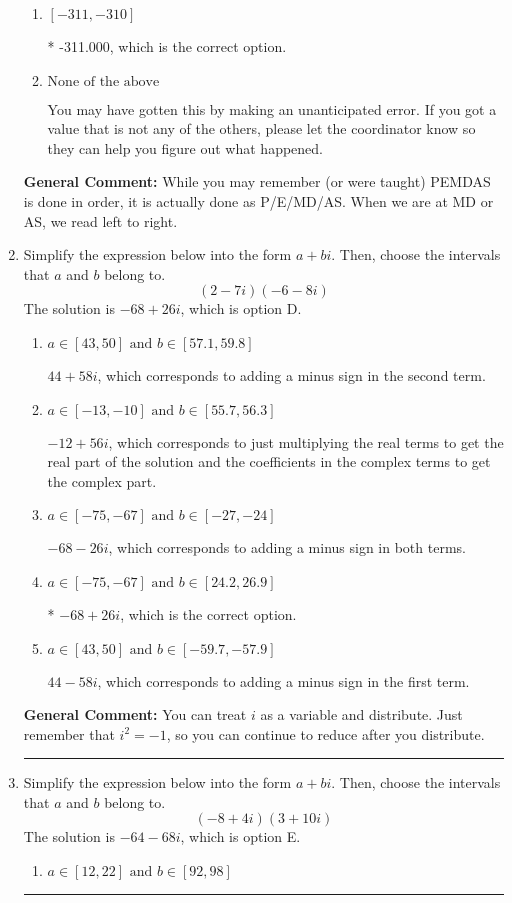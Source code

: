 \documentclass{extbook}[14pt]
\newcommand{\litem}[1]{\item #1

\rule{\textwidth}{0.4pt}}
\begin{document}
\begin{enumerate}
{\begin{enumerate}[label=\Alph*.]
 -2844.000, which corresponds to not distributing a negative correctly.
\item \( [-311, -310] \)

* -311.000, which is the correct option.
\item \( \text{None of the above} \)

 You may have gotten this by making an unanticipated error. If you got a value that is not any of the others, please let the coordinator know so they can help you figure out what happened.
\end{enumerate}

\textbf{General Comment:} While you may remember (or were taught) PEMDAS is done in order, it is actually done as P/E/MD/AS. When we are at MD or AS, we read left to right.
}
\litem{
Simplify the expression below into the form $a+bi$. Then, choose the intervals that $a$ and $b$ belong to.
\[ (2 - 7 i)(-6 - 8 i) \]The solution is \( -68 + 26 i \), which is option D.\begin{enumerate}[label=\Alph*.]
\item \( a \in [43, 50] \text{ and } b \in [57.1, 59.8] \)

 $44 + 58 i$, which corresponds to adding a minus sign in the second term.
\item \( a \in [-13, -10] \text{ and } b \in [55.7, 56.3] \)

 $-12 + 56 i$, which corresponds to just multiplying the real terms to get the real part of the solution and the coefficients in the complex terms to get the complex part.
\item \( a \in [-75, -67] \text{ and } b \in [-27, -24] \)

 $-68 - 26 i$, which corresponds to adding a minus sign in both terms.
\item \( a \in [-75, -67] \text{ and } b \in [24.2, 26.9] \)

* $-68 + 26 i$, which is the correct option.
\item \( a \in [43, 50] \text{ and } b \in [-59.7, -57.9] \)

 $44 - 58 i$, which corresponds to adding a minus sign in the first term.
\end{enumerate}

\textbf{General Comment:} You can treat $i$ as a variable and distribute. Just remember that $i^2=-1$, so you can continue to reduce after you distribute.
}
\litem{
Simplify the expression below into the form $a+bi$. Then, choose the intervals that $a$ and $b$ belong to.
\[ (-8 + 4 i)(3 + 10 i) \]The solution is \( -64 - 68 i \), which is option E.\begin{enumerate}[label=\Alph*.]
\item \( a \in [12, 22] \text{ and } b \in [92, 98] \)


\end{enumerate}}
\end{enumerate}
\end{document}
